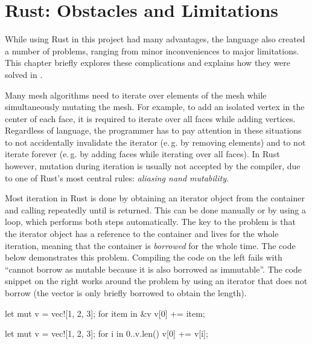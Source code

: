 \chapter{Rust: Obstacles and Limitations}

While using Rust in this project had many advantages, the language also created a number of problems, ranging from minor inconveniences to major limitations.
This chapter briefly explores these complications and explains how they were solved in .

\vspace{1cm}

Many mesh algorithms need to iterate over elements of the mesh while simultaneously mutating the mesh.
For example, to add an isolated vertex in the center of each face, it is required to iterate over all faces while adding vertices.
Regardless of language, the programmer has to pay attention in these situations to not accidentally invalidate the iterator (e.\,g. by removing elements) and to not iterate forever (e.\,g. by adding faces while iterating over all faces).
In Rust however, mutation during iteration is usually not accepted by the compiler, due to one of Rust's most central rules: \emph{aliasing nand mutability}.

Most iteration in Rust is done by obtaining an iterator object from the container and calling  repeatedly until  is returned.
This can be done manually or by using a  loop, which performs both steps automatically.
The key to the problem is that the iterator object has a reference to the container and lives for the whole iteration, meaning that the container is \emph{borrowed} for the whole time.
The code below demonstrates this problem.
Compiling the code on the left fails with \enquote{cannot borrow  as mutable because it is also borrowed as immutable}.
The code snippet on the right works around the problem by using an iterator that does not borrow  (the vector is only briefly borrowed to obtain the length).

\vspace{5mm}
\begin{minipage}{0.49\textwidth}
  \begin{rustcode}
    let mut v = vec![1, 2, 3];
    for item in &v {
        v[0] += item;
    }
  \end{rustcode}
\end{minipage}
\begin{minipage}{0.49\textwidth}
  \begin{rustcode}
    let mut v = vec![1, 2, 3];
    for i in 0..v.len() {
        v[0] += v[i];
    }
  \end{rustcode}
\end{minipage}
\vspace{5mm}

